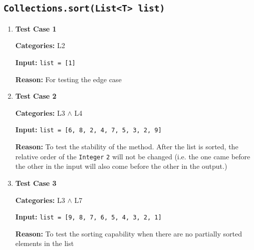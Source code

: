 \documentclass[12pt, a4paper]{article}
\begin{document}
\subsection{\texttt{Collections.sort(List<T> list)}}
\begin{enumerate}
  \item \textbf{Test Case 1}
  \par\quad\textbf{Categories:} L2
  \par\quad\textbf{Input:} \texttt{list = [1]}
  \par\quad\textbf{Reason:} For testing the edge case

  \item \textbf{Test Case 2}
  \par\quad\textbf{Categories:} L3 $\wedge$ L4
  \par\quad\textbf{Input:} \texttt{list = [6, 8, 2, 4, 7, 5, 3, 2, 9]}
  \par\quad\textbf{Reason:} To test the stability of the method. After the list is sorted, the
  relative order of the \texttt{Integer} \texttt{2} will not be changed (i.e. the one came before
  the other in the input will also come before the other in the output.)

  \item \textbf{Test Case 3}
  \par\quad\textbf{Categories:} L3 $\wedge$ L7
  \par\quad\textbf{Input:} \texttt{list = [9, 8, 7, 6, 5, 4, 3, 2, 1]}
  \par\quad\textbf{Reason:} To test the sorting capability when there are no partially sorted
  elements in the list
\end{enumerate}
\end{document}
